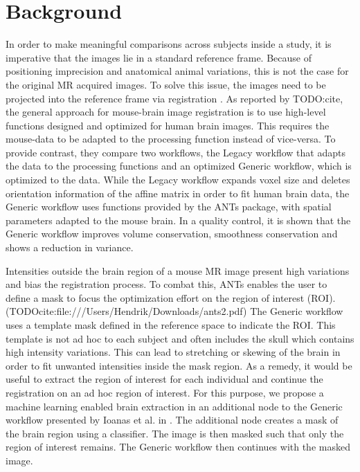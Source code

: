 \section{Background}
In order to make meaningful comparisons across subjects inside a study, it is imperative that the images lie in a standard reference frame.
Because of positioning imprecision and anatomical animal variations, this is not the case for the original MR acquired images.
To solve this issue, the images need to be projected into the reference frame via registration \cite{maintz_overview_nodate, sotiras_deformable_2013}.
As reported by TODO:cite, the general approach for mouse-brain image registration is to use high-level functions designed and optimized for human brain images.
This requires the mouse-data to be adapted to the processing function instead of vice-versa.
To provide contrast, they compare two workflows, the Legacy workflow that adapts the data to the processing functions and an optimized Generic workflow, which is optimized to the data.
While the Legacy workflow expands voxel size and deletes orientation information of the affine matrix in order to fit human brain data, the Generic workflow uses functions provided by the ANTs package, with spatial parameters adapted to the mouse brain.
In a quality control, it is shown that the Generic workflow improves volume conservation, smoothness conservation and shows a reduction in variance.

Intensities outside the brain region of a mouse MR image present high variations and bias the registration process.
To combat this, ANTs enables the user to define a mask to focus the optimization
effort on the region of interest (ROI). (TODOcite:file:///Users/Hendrik/Downloads/ants2.pdf)
The Generic workflow uses a template mask defined in the reference space to indicate the ROI.
This template is not ad hoc to each subject and often includes the skull which contains high intensity variations.
This can lead to stretching or skewing of the brain in order to fit unwanted intensities inside the mask region.
As a remedy, it would be useful to extract the region of interest for each individual and continue the registration on an ad hoc region of interest.
For this purpose, we propose a machine learning enabled brain extraction in an additional node to the Generic workflow presented by Ioanas et al. in \cite{ioanas_optimized_2019}.
The additional node creates a mask of the brain region using a classifier.
The image is then masked such that only the region of interest remains.
The Generic workflow then continues with the masked image.


